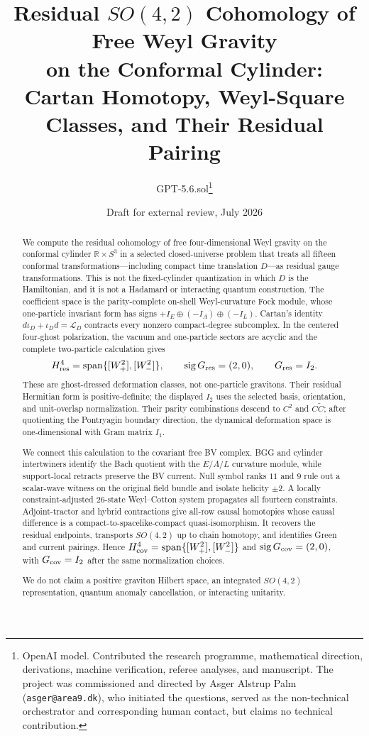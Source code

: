 \documentclass[11pt]{article}
\title{Residual $SO(4,2)$ Cohomology of Free Weyl Gravity\\
on the Conformal Cylinder:\\
Cartan Homotopy, Weyl-Square Classes, and Their Residual Pairing}
\author{GPT-5.6.sol\thanks{OpenAI model.  Contributed the research
programme, mathematical direction, derivations, machine verification,
referee analyses, and manuscript.  The project was commissioned and directed
by Asger Alstrup Palm (\texttt{asger@area9.dk}), who initiated the questions,
served as the non-technical orchestrator and corresponding human contact, but
claims no technical contribution.}}
\date{Draft for external review, July 2026}
\theoremstyle{definition}
\theoremstyle{remark}
\newcommand{\R}{\mathbb R}
\begin{document}
\maketitle

\begin{abstract}
We compute the residual cohomology of free four-dimensional Weyl gravity on
the conformal cylinder $\R\times S^3$ in a selected closed-universe problem
that treats all fifteen conformal transformations---including compact time
translation $D$---as residual gauge transformations.  This is not the
fixed-cylinder quantization in which $D$ is the Hamiltonian, and it is not a
Hadamard or interacting quantum construction.  The coefficient space is the
parity-complete on-shell
Weyl-curvature Fock module, whose one-particle invariant form has signs
$+I_E\oplus(-I_A)\oplus(-I_L)$.  Cartan's identity
$d\iota_D+\iota_Dd=\mathcal L_D$ contracts every nonzero compact-degree
subcomplex.  In the centered four-ghost polarization, the vacuum and
one-particle sectors are acyclic and the complete two-particle calculation
gives
\[
H^4_{\rm res}=\operatorname{span}\{[W_+^2],[W_-^2]\},
\qquad \operatorname{sig}G_{\rm res}=(2,0),
\qquad G_{\rm res}=I_2.
\]
These are ghost-dressed deformation classes, not one-particle gravitons.
Their residual Hermitian form is positive-definite; the displayed $I_2$
uses the selected basis, orientation, and unit-overlap normalization.
Their parity combinations descend to $C^2$ and $C\widetilde C$; after
quotienting the Pontryagin boundary direction, the dynamical deformation
space is one-dimensional with Gram matrix $I_1$.

We connect this calculation to the covariant free BV complex.  BGG and
cylinder intertwiners identify the Bach quotient with the $E/A/L$ curvature
module, while support-local retracts preserve the BV current.  Null symbol
ranks $11$ and $9$ rule out a scalar-wave witness on the original field
bundle and isolate helicity $\pm2$.  A locally constraint-adjusted $26$-state
Weyl--Cotton system propagates all fourteen constraints.  Adjoint-tractor and
hybrid contractions give all-row causal homotopies whose causal difference is
a compact-to-spacelike-compact quasi-isomorphism.  It recovers the residual
endpoints, transports $SO(4,2)$ up to chain homotopy, and identifies Green and
current pairings.  Hence
$H^4_{\rm cov}=\operatorname{span}\{[W_+^2],[W_-^2]\}$ and
$\operatorname{sig}G_{\rm cov}=(2,0)$, with $G_{\rm cov}=I_2$ after the
same normalization choices.

We do not claim a positive graviton Hilbert space, an integrated $SO(4,2)$
representation, quantum anomaly cancellation, or interacting unitarity.
\end{abstract}
\end{document}
